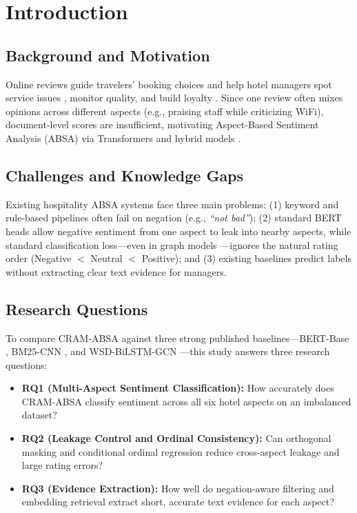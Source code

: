 \documentclass{llncs}
\begin{document}
\section{Introduction}
\label{sec:introduction}

\subsection{Background and Motivation}
\label{subsec:background}
Online reviews guide travelers' booking choices \cite{ref20_vo2022} and help hotel managers spot service issues \cite{ref21_llorens2023}, monitor quality, and build loyalty \cite{ref19_tahir2024,ref26_piriyakul2024}. Since one review often mixes opinions across different aspects (e.g., praising staff while criticizing WiFi), document-level scores are insufficient, motivating Aspect-Based Sentiment Analysis (ABSA) via Transformers \cite{ref01_bimaputra2023} and hybrid models \cite{ref04_namee2023}.

\subsection{Challenges and Knowledge Gaps}
\label{subsec:problem}
Existing hospitality ABSA systems face three main problems: (1) keyword and rule-based pipelines \cite{ref04_namee2023} often fail on negation (e.g., \textit{``not bad''}); (2) standard BERT heads \cite{ref01_bimaputra2023} allow negative sentiment from one aspect to leak into nearby aspects, while standard classification loss---even in graph models \cite{ref09_nadeem2025}---ignores the natural rating order (Negative $<$ Neutral $<$ Positive); and (3) existing baselines \cite{ref01_bimaputra2023,ref04_namee2023,ref09_nadeem2025} predict labels without extracting clear text evidence for managers.

\subsection{Research Questions}
\label{subsec:research_questions}
To compare CRAM-ABSA against three strong published baselines---BERT-Base \cite{ref01_bimaputra2023}, BM25-CNN \cite{ref04_namee2023}, and WSD-BiLSTM-GCN \cite{ref09_nadeem2025}---this study answers three research questions:
\begin{itemize}
    \item \textbf{RQ1 (Multi-Aspect Sentiment Classification):} How accurately does CRAM-ABSA classify sentiment across all six hotel aspects on an imbalanced dataset?
    \item \textbf{RQ2 (Leakage Control and Ordinal Consistency):} Can orthogonal masking and conditional ordinal regression reduce cross-aspect leakage and large rating errors?
    \item \textbf{RQ3 (Evidence Extraction):} How well do negation-aware filtering and embedding retrieval extract short, accurate text evidence for each aspect?
\end{itemize}
\end{document}
